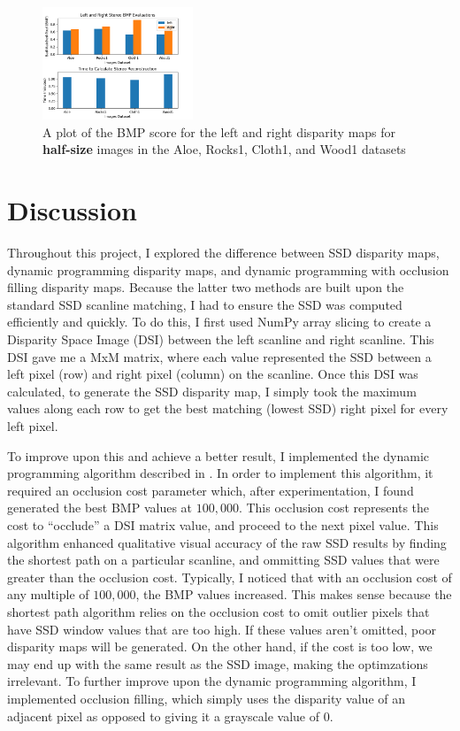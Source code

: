 \documentclass[11pt,a4paper]{article}
\begin{document}
\begin{figure}
  \centering
  \includegraphics[width=0.40\textwidth]{figures/half_plots.png}
  \caption{A plot of the BMP score for the left and right disparity maps for \textbf{half-size} images in the Aloe, Rocks1, Cloth1, and Wood1 datasets}
  \label{fig:half_plots}
\end{figure}


\section{Discussion}

Throughout this project, I explored the difference between SSD disparity maps, dynamic programming disparity maps, 
 and dynamic programming with occlusion filling disparity maps. Because the latter two methods are built upon the standard SSD 
 scanline matching, I had to ensure the SSD was computed efficiently and quickly. To do this, I first used NumPy array 
 slicing to create a Disparity Space Image (DSI) between the left scanline and right scanline. This DSI gave me a MxM matrix, 
 where each value represented the SSD between a left pixel (row) and right pixel (column) on the scanline. Once this DSI was calculated, 
 to generate the SSD disparity map, I simply took the maximum values along each row to get the best matching (lowest SSD) 
 right pixel for every left pixel. 

To improve upon this and achieve a better result, I implemented the dynamic programming algorithm described in \cite{COX1996542}. 
 In order to implement this algorithm, it required an occlusion cost parameter which, after experimentation, I found generated the best BMP values at $100,000$. This occlusion 
 cost represents the cost to “occlude” a DSI matrix value, and proceed to the next pixel value. This algorithm enhanced qualitative visual 
 accuracy of the raw SSD results by finding the shortest path on a particular scanline, and ommitting SSD values that were greater than the occlusion cost. Typically, I noticed that with an occlusion cost of any multiple of $100,000$, 
 the BMP values increased. This makes sense because the shortest path algorithm relies on the occlusion cost to omit outlier pixels that have SSD window values that 
 are too high. If these values aren't omitted, poor disparity maps will be generated. On the other hand, if the cost is too low, we may end up with the same result as the SSD image, making the optimzations irrelevant. To further improve upon the dynamic programming algorithm, I implemented occlusion filling, which simply uses the disparity
 value of an adjacent pixel as opposed to giving it a grayscale value of $0$. 
 
\end{document}

